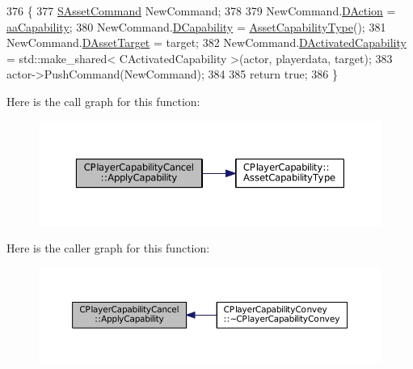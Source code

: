\begin{DoxyCode}
376                                                                                                            
                                                          \{
377     \hyperlink{structSAssetCommand}{SAssetCommand} NewCommand;
378     
379     NewCommand.\hyperlink{structSAssetCommand_a8edd3b3d59a76d5514ba403bc8076a75}{DAction} = \hyperlink{GameDataTypes_8h_ab47668e651a3032cfb9c40ea2d60d670acf9fb164e8abd71c71f4a8c7fda360d4}{aaCapability};
380     NewCommand.\hyperlink{structSAssetCommand_a734ea7c6847457b437360f333f570ff9}{DCapability} = \hyperlink{classCPlayerCapability_a433bb196cd6ab6a932f1cac102b3aa98}{AssetCapabilityType}();
381     NewCommand.\hyperlink{structSAssetCommand_a3d9b43f6e59c386c48c41a65448a0c39}{DAssetTarget} = target;
382     NewCommand.\hyperlink{structSAssetCommand_ad8beda19520811cc70fe1eab16c774dd}{DActivatedCapability} = std::make\_shared< CActivatedCapability >(actor, 
      playerdata, target);
383     actor->PushCommand(NewCommand);
384 
385     \textcolor{keywordflow}{return} \textcolor{keyword}{true};
386 \}
\end{DoxyCode}
Here is the call graph for this function\+:\nopagebreak
\begin{figure}[H]
\begin{center}
\leavevmode
\includegraphics[width=350pt]{classCPlayerCapabilityCancel_a8f738ac375bf5d1e7f8b768bce16b946_cgraph}
\end{center}
\end{figure}
Here is the caller graph for this function\+:\nopagebreak
\begin{figure}[H]
\begin{center}
\leavevmode
\includegraphics[width=350pt]{classCPlayerCapabilityCancel_a8f738ac375bf5d1e7f8b768bce16b946_icgraph}
\end{center}
\end{figure}
\hypertarget{classCPlayerCapabilityCancel_a0221e4e768c998cb46f1dbc757647ec1}{}\label{classCPlayerCapabilityCancel_a0221e4e768c998cb46f1dbc757647ec1} 
